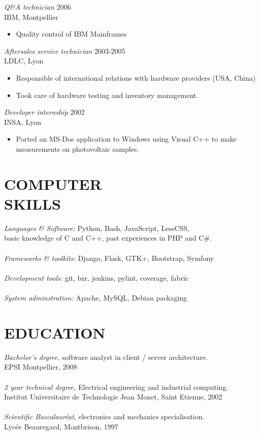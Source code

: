 \documentclass[margin]{res}
\begin{document}
\begin{resume}
{\sl Q\&A technician} \hfill     2006 \\
IBM, Montpellier
\begin{itemize}  \itemsep -2pt
    \item  Quality control of IBM Mainframes
\end{itemize}

{\sl Aftersales service technician} \hfill     2003-2005 \\
LDLC, Lyon
\begin{itemize}  \itemsep -2pt
    \item Responsible of international relations with hardware providers (USA, China)
    \item Took care of hardware testing and inventory management.
\end{itemize}

{\sl Developer internship} \hfill   2002 \\
INSA, Lyon
\begin{itemize}  \itemsep -2pt
    \item  Ported an MS-Dos application to Windows using Visual C++ to make
    measurements on photovoltaic samples.
\end{itemize}


\section{COMPUTER \\ SKILLS} {\sl Languages \& Software:} Python, Bash, JavaScript, LessCSS, \\
		basic knowledge of C and C++,  past experiences in PHP and C\#.\\ \\
		{\sl Frameworks \& toolkits:} Django, Flask, GTK+, Bootstrap, Symfony\\ \\
                	{\sl Development tools:} git, bzr, jenkins, pylint, coverage, fabric\\ \\
		{\sl System adminstration:} Apache, MySQL, Debian packaging


\section{EDUCATION} {\sl Bachelor's degree,} software analyst in client / server architecture.\\
                	EPSI Montpellier, 2008\\ \\
		{\sl 2 year technical degree,} Electrical engineering and  industrial computing.\\
		Institut Universitaire de Technologie Jean Monet, Saint Etienne, 2002\\ \\
		{\sl Scientific Baccalaur\'{e}at,}  electronics and mechanics specialisation.\\
		Lyc\'{e}e Beauregard, Montbrison, 1997


\end{resume}
\end{document}
